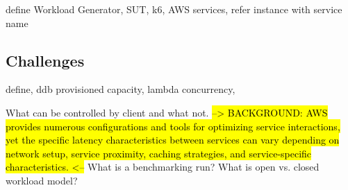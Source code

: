 define Workload Generator, SUT, k6, AWS services, refer instance with service name

\subsection{Challenges}
\label{challenges}

define, ddb provisioned capacity, lambda concurrency,

What can be controlled by client and what not.
\hl{--> BACKGROUND: AWS provides numerous configurations and tools for optimizing service interactions, yet the specific latency characteristics between services can vary depending on network setup, service proximity, caching strategies, and service-specific characteristics. <--}
What is a benchmarking run?
What is open vs. closed workload model?